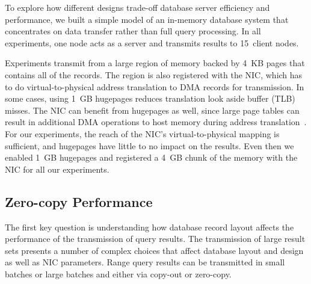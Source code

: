 To explore how different designs trade-off database server efficiency and
performance, we built a simple model of an in-memory database system that
concentrates on data transfer rather than full query processing.  In all experiments, one node acts
as a server and transmits results to 15~client nodes.

Experiments transmit from a large region of memory backed by 4~KB pages that contains all of
the records.  The region is also
registered with the NIC, which has to do virtual-to-physical address
translation to DMA records for transmission.
In some cases, using 1~GB hugepages reduces translation look aside buffer
(TLB) misses.  The NIC can benefit from
hugepages as well, since large page tables can result in additional
DMA operations to host memory during address translation~\cite{farm,rdma}. For
our experiments, the reach of the NIC's virtual-to-physical mapping is
sufficient, and hugepages have little to no impact on the results. Even then we 
enabled 1~GB hugepages and registered a 4~GB chunk of the memory with the NIC 
for all our experiments.

\subsection{Zero-copy Performance}
\label{sec:zero-copy-tput}

%

The first key question is understanding how database record layout affects the
performance of the transmission of query results.  The transmission of large
result sets presents a number of complex choices that affect
database layout and design as well as NIC parameters.  Range query
results can be transmitted in small batches or large batches and either via
copy-out or zero-copy.

